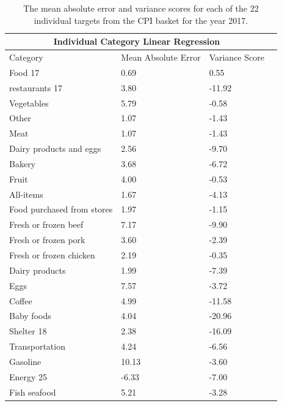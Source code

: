 \documentclass[12pt]{dalthesis}
\begin{document}
\begin{table}
	\caption{The mean absolute error and variance scores for each of the 22 individual targets from the CPI basket for the year 2017. }
	\label{tab:targets2017}
    \begin{tabular}{ |p{5cm}||p{4cm}|p{4cm}|p{4cm}|  }
       \hline
       \multicolumn{3}{|c|}{Individual Category Linear Regression } \\
       \hline
       Category    & Mean Absolute Error    & Variance Score \\
       \hline
       Food 17    & 0.69    & 0.55\\
       restaurants 17    & 3.80    & -11.92\\
       Vegetables    & 5.79    & -0.58\\
       Other    & 1.07    & -1.43\\
       Meat    & 1.07    & -1.43\\
       Dairy products and eggs    &2.56    & -9.70\\
       Bakery    & 3.68    & -6.72\\
       Fruit    & 4.00    & -0.53\\
       All-items    & 1.67    & -4.13\\
       Food purchased from stores    & 1.97    & -1.15\\
       Fresh or frozen beef    & 7.17    & -9.90\\
       Fresh or frozen pork    & 3.60    & -2.39\\
       Fresh or frozen chicken    & 2.19    & -0.35\\
       Dairy products    & 1.99    & -7.39\\
       Eggs    & 7.57    & -3.72\\
       Coffee    & 4.99    & -11.58\\
       Baby foods    & 4.04    & -20.96\\
       Shelter 18    & 2.38    & -16.09\\
       Transportation    & 4.24    & -6.56\\
       Gasoline    & 10.13    & -3.60\\
       Energy 25    & -6.33    & -7.00\\
       Fish seafood    & 5.21    & -3.28\\
       \hline
    \end{tabular}
\end{table}

\end{document}
